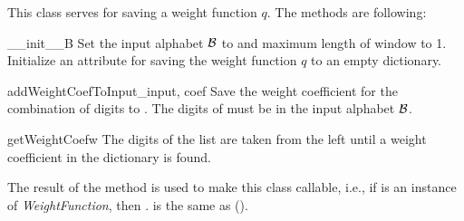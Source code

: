 This class serves for saving a weight function $q$. The methods  are following:

\begin{method}{\_\_init\_\_}{B}
Set the input alphabet $\mathcal{B}$ to  and maximum length of window to 1. Initialize an attribute  for saving the weight function $q$ to an empty dictionary. 
\end{method}

\newpage
\begin{method}{addWeightCoefToInput}{\_input, coef}
Save the weight coefficient  for the combination of digits  to . The digits of  must be in the input alphabet $\mathcal{B}$.
\end{method}

\begin{method}{getWeightCoef}{w}
The digits of the list  are taken from the left until a weight coefficient in the dictionary  is found. 
\end{method}

The result of the method  is used to make this class callable, i.e., if  is an instance of \emph{WeightFunction}, then . is the same as ().




